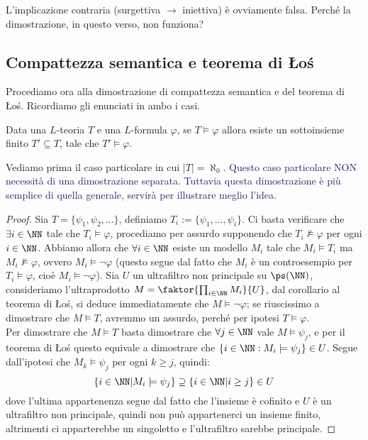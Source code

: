 \begin{exercise}
    L'implicazione contraria (surgettiva $\to$ iniettiva) è ovviamente falsa. Perché la dimostrazione, in questo verso, non funziona?
\end{exercise}

\subsection{Compattezza semantica e teorema di Łoś}

Procediamo ora alla dimostrazione di compattezza semantica e del teorema di Łoś. Ricordiamo gli enunciati in ambo i casi.

\begin{theorem}
    Data una $L$-teoria $T$ e una $L$-formula $\varphi$, se $T \models \varphi$ allora esiste un sottoinsieme finito $T' \subseteq T$,
    tale che $T' \models \varphi$.
\end{theorem}

Vediamo prima il caso particolare in cui $|T| = \aleph_0$. \textcolor{MidnightBlue}{Questo caso particolare NON necessità di una dimostrazione separata.
Tuttavia questa dimostrazione è più semplice di quella generale, servirà per illustrare meglio l'idea.}

\begin{proof}
    Sia $T = \{\psi_1,\psi_2,\ldots\}$, definiamo $T_i := \{\psi_1,\ldots,\psi_i\}$. Ci basta verificare che $\exists i \in \NN$ tale che $T_i \models \varphi$, procediamo per assurdo supponendo che $T_i \not\models \varphi$ per ogni $i \in \NN$.
    Abbiamo allora che $\forall i \in \NN$ esiste un modello $M_i$ tale che $M_i \models T_i$ ma $M_i \not\models \varphi$, ovvero $M_i \models \neg \varphi$ (questo segue dal fatto che $M_i$ è un controesempio per $T_i \models \varphi$, cioè $M_i \models \neg \varphi$). Sia $U$ un ultrafiltro non principale su $\ps(\NN)$, consideriamo l'ultraprodotto $M = \faktor{\prod_{i \in \NN} M_i}{U}$,
    dal corollario al teorema di Łoś, si deduce immediatamente che $M \models \neg \varphi$; se riuscissimo a dimostrare che $M \models T$, avremmo un assurdo, perché per ipotesi $T \models \varphi$.\\
    Per dimostrare che $M \models T$ basta dimostrare che $\forall j \in \NN$ vale $M \models \psi_j$, e per il teorema di Łoś questo equivale a dimostrare che $\{i \in \NN : M_i \models \psi_j\} \in U$.
    Segue dall'ipotesi che $M_k \models \psi_j$ per ogni $k \geq j$, quindi:
    \[ \{i \in \NN | M_i \models \psi_j\} \supseteq \{i \in \NN | i \geq j\} \in U
    \]
    dove l'ultima appartenenza segue dal fatto che l'insieme è cofinito e $U$ è un ultrafiltro non principale, quindi non può appartenerci un insieme finito, altrimenti ci apparterebbe un singoletto e l'ultrafiltro sarebbe principale.
\end{proof}

